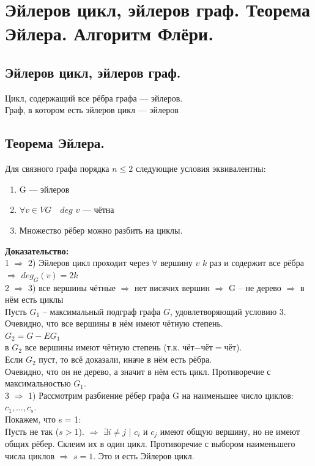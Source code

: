 \documentclass[12pt]{article}
\begin{document}
\section{Эйлеров цикл, эйлеров граф. Теорема Эйлера. Алгоритм Флёри.}
	\subsection{Эйлеров цикл, эйлеров граф.}
		Цикл, содержащий все рёбра графа — эйлеров.\\
		Граф, в котором есть эйлеров цикл — эйлеров
	\subsection{Теорема Эйлера.}
		Для связного графа порядка $n \leqslant 2$ следующие условия эквивалентны:
		\begin{enumerate}
			\item G — эйлеров
			\item $\forall v \in VG \quad deg$ $v$ — чётна
			\item Множество рёбер можно разбить на циклы.
		\end{enumerate}
		\textbf{Доказательство:}\\
			1 $\Rightarrow$ 2) Эйлеров цикл проходит через $\forall$ вершину $v$ $k$ раз и содержит все рёбра $\Rightarrow$ $deg_G(v) = 2k$\\
			2 $\Rightarrow$ 3) все вершины чётные $\Rightarrow$ нет висячих вершин $\Rightarrow$ G – не дерево $\Rightarrow$ в нём есть циклы\\
			Пусть $G_1$ – максимальный подграф графа $G$, удовлетворяющий условию 3. Очевидно, что все вершины в нём имеют чётную степень.\\
			$G_2 = G-EG_1$\\
			в $G_2$ все вершины имеют чётную степень (т.к. чёт$-$чёт$=$чёт).\\
			Если $G_2$ пуст, то всё доказали, иначе в нём есть рёбра.\\
			Очевидно, что он не дерево, а значит в нём есть цикл. Противоречие с максимальностью $G_1$.\\
			3 $\Rightarrow$ 1) Рассмотрим разбиение рёбер графа G на наименьшее число циклов: $c_1,\dotsc,c_s$.\\
			Покажем, что s = 1:\\
			Пусть не так ($s > 1$). $\Rightarrow$ $\exists i \neq j$ | $c_i$ и $c_j$ имеют общую вершину, но не имеют общих рёбер. Склеим их в один цикл. Противоречие с выбором наименьшего числа циклов $\Rightarrow$ $s = 1$. Это и есть Эйлеров цикл.\\
		\qedsymbol
\end{document}
